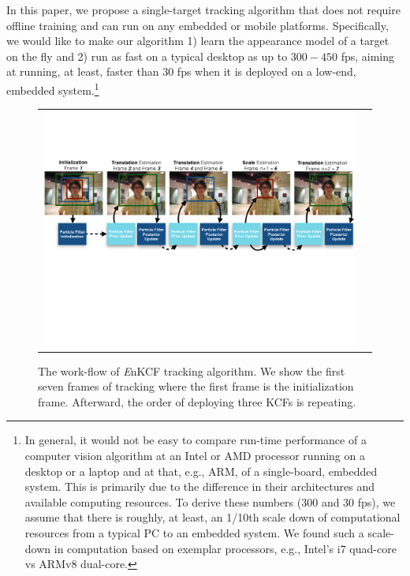 \documentclass[10pt,twocolumn,letterpaper]{article}
\begin{document}
In this paper, we propose a single-target tracking algorithm that does
not require offline training and can run on any embedded or mobile
platforms. Specifically, we would like to make our algorithm 1) learn
the appearance model of a target on the fly and 2) run as fast on a
typical desktop as up to $300-450$ fps, aiming at running, at least,
faster than 30 fps when it is deployed on a low-end, embedded
system.\footnote{In general, it would not be easy to compare run-time
  performance of a computer vision algorithm at an Intel or AMD
  processor running on a desktop or a laptop and at that, e.g., ARM,
  of a single-board, embedded system. This is primarily due to the
  difference in their architectures and available computing
  resources. To derive these numbers (300 and 30 fps), we assume that
  there is roughly, at least, an 1/10th scale down of computational
  resources from a typical PC to an embedded system. We found such a
  scale-down in computation based on exemplar processors, e.g.,
  Intel's i7 quad-core vs ARMv8 dual-core.}

\begin{figure}[!h]
\centering
\begin{tabular}{cc}
\includegraphics[width=14.00cm]{./figures/Workflow_MKCF+PF.pdf}\\
\end{tabular}
\caption{The work-flow of {\it E}nKCF tracking algorithm. We show the
  first seven frames of tracking where the first frame is the
  initialization frame. Afterward, the order of deploying three KCFs
  is repeating.}
\label{Workflows}
\end{figure}
\end{document}
